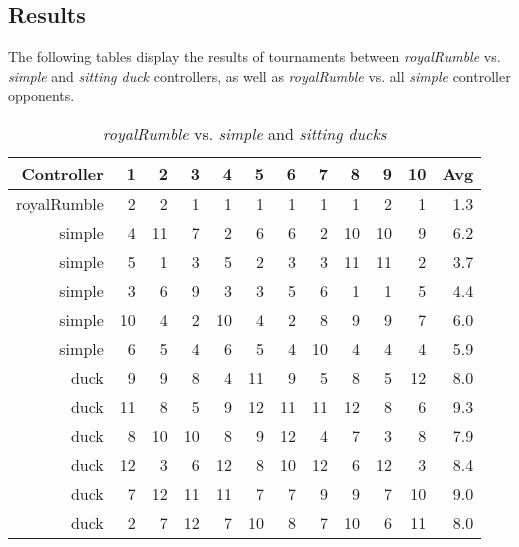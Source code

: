\subsection{Results}

The following tables display the results of tournaments between \emph{royalRumble} vs. \emph{simple} and \emph{sitting duck} controllers, as well as \emph{royalRumble} vs. all \emph{simple} controller opponents.

\begin{table}[H]
\centering
\caption{\emph{royalRumble} vs. \emph{simple} and \emph{sitting ducks}}
\label{checkSix vs. simple}
\begin{tabular}{r|r|r|r|r|r|r|r|r|r|r|r}
Controller	& 1	 & 2  & 3  & 4  & 5  & 6  & 7  & 8  & 9  & 10 & Avg \\ \hline
royalRumble & 2	 & 2  &	1  & 1  & 1  & 1  & 1  & 1  & 2  & 1  & 1.3 \\
simple		& 4	 & 11 &	7  & 2  & 6  & 6  & 2  & 10 & 10 & 9  & 6.2 \\
simple		& 5	 & 1  &	3  & 5  & 2  & 3  & 3  & 11 & 11 & 2  & 3.7 \\
simple		& 3	 & 6  &	9  & 3  & 3  & 5  & 6  & 1  & 1  & 5  & 4.4 \\
simple		& 10 & 4  & 2  & 10 & 4  & 2  & 8  & 9  & 9  & 7  & 6.0 \\
simple		& 6  & 5  & 4  & 6  & 5  & 4  & 10 & 4  & 4  & 4  & 5.9 \\
duck		& 9  & 9  & 8  & 4  & 11 & 9  & 5  & 8  & 5  & 12 & 8.0 \\
duck		& 11 & 8  & 5  & 9  & 12 & 11 & 11 & 12 & 8  & 6  & 9.3 \\
duck		& 8  & 10 & 10 & 8  & 9  & 12 & 4  & 7  & 3  & 8  & 7.9 \\
duck		& 12 & 3  & 6  & 12 & 8  & 10 & 12 & 6  & 12 & 3  & 8.4 \\
duck		& 7  & 12 & 11 & 11 & 7  & 7  & 9  & 9  & 7  & 10 & 9.0 \\
duck		& 2  & 7  & 12 & 7  & 10 & 8  & 7  & 10 & 6  & 11 & 8.0
\end{tabular}
\end{table}

